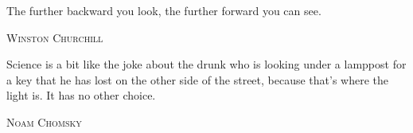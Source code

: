 \begin{vplace}[0.7]

\setlength{\epigraphwidth}{0.72\textwidth}

\epigraph{The further backward you look, the further forward you can see.}{\textsc{Winston Churchill}}

\vspace{1cm}

\epigraph{Science is a bit like the joke about the drunk who is looking under a lamppost for a key that he has lost on the other side of the street, because that's where the light is. It has no other choice.}{\textsc{Noam Chomsky}}


\end{vplace}